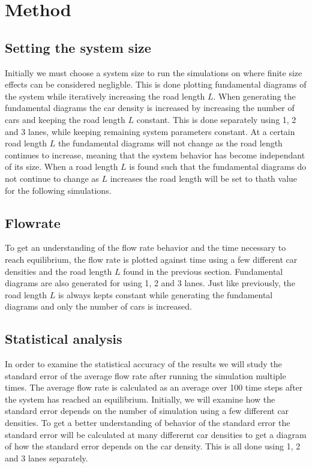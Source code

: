 \documentclass[a4paper,12pt]{article}
\begin{document}
\section*{Method}
\subsection*{Setting the system size}
Initially we must choose a system size to run the simulations on where finite size effects can be considered negligble. This is done plotting fundamental
diagrams of the system while iteratively increasing the road length $L$. When generating the fundamental diagrams the car density is increased by increasing the number
of cars and keeping the road length $L$ constant. This is done separately using 1, 2 and 3 lanes, while keeping remaining system
parameters constant. At a certain road length $L$ the fundamental diagrams will not change as the road length
continues to increase, meaning that the system behavior has become independant of its size. When a road length $L$ is found such that the fundamental diagrams
do not continue to change as $L$ increases the road length will be set to thath value for the following simulations.

\subsection*{Flowrate}
To get an understanding of the flow rate behavior and the time necessary to reach equilibrium, the flow rate is plotted against time using a few different 
car densities and the road length $L$ found in the previous section. Fundamental diagrams are also generated for using 1, 2 and 3 lanes. Just like previously,
the road length $L$ is always kepts constant while generating the fundamental diagrams and only the number of cars is increased.

\subsection*{Statistical analysis}
In order to examine the statistical accuracy of the results we will study the standard error of the average flow rate after running the simulation multiple times. 
The average flow rate is calculated as an average over 100 time steps after the system has reached an equilibrium. Initially, we will examine how the standard error
depends on the number of simulation using a few different car densities. To get a better understanding of behavior of the standard error the standard error will be calculated
at many differernt car densities to get a diagram of how the standard error depends on the car density. This is all done using 1, 2 and 3 lanes separately.
\end{document}

